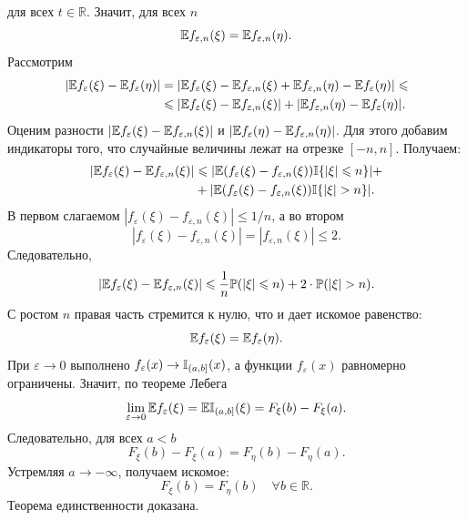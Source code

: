 \begin{proofbox}
    для всех $t \in \mathbb{R}$. Значит, для всех $n$
    \begin{equation*}
        \mathbb{E} f_{\varepsilon,n}(\xi) = \mathbb{E} f_{\varepsilon,n}(\eta).
    \end{equation*}
    Рассмотрим
    \begin{align*}
        |\mathbb{E} f_{\varepsilon}(\xi) - \mathbb{E} f_{\varepsilon}(\eta)| &= |\mathbb{E} f_{\varepsilon}(\xi) - \mathbb{E} f_{\varepsilon,n}(\xi) + \mathbb{E} f_{\varepsilon,n}(\eta) - \mathbb{E} f_{\varepsilon}(\eta)| \leqslant \\
        &\leqslant |\mathbb{E} f_{\varepsilon}(\xi) - \mathbb{E} f_{\varepsilon,n}(\xi)| + |\mathbb{E} f_{\varepsilon,n}(\eta) - \mathbb{E} f_{\varepsilon}(\eta)|.
    \end{align*}
    Оценим разности $|\mathbb{E} f_{\varepsilon}(\xi) - \mathbb{E} f_{\varepsilon,n}(\xi)|$ и $|\mathbb{E} f_{\varepsilon}(\eta) - \mathbb{E} f_{\varepsilon,n}(\eta)|$. Для этого добавим индикаторы того, что случайные величины лежат на отрезке $[-n, n]$. Получаем:
    \begin{align*}
        |\mathbb{E} f_{\varepsilon}(\xi) - \mathbb{E} f_{\varepsilon,n}(\xi)| &\leqslant |\mathbb{E}(f_{\varepsilon}(\xi) - f_{\varepsilon,n}(\xi))\mathbb{I}\{|\xi| \leqslant n\}| + \\
        &+ |\mathbb{E}(f_{\varepsilon}(\xi) - f_{\varepsilon,n}(\xi))\mathbb{I}\{|\xi| > n\}|.
    \end{align*}
    В первом слагаемом $|f_{\varepsilon}(\xi) - f_{\varepsilon,n}(\xi)| \leqslant 1/n$, а во втором
    \begin{equation*}
        |f_{\varepsilon}(\xi) - f_{\varepsilon,n}(\xi)| = |f_{\varepsilon,n}(\xi)| \leqslant 2.
    \end{equation*}
    Следовательно,
    \begin{equation*}
        |\mathbb{E} f_{\varepsilon}(\xi) - \mathbb{E} f_{\varepsilon,n}(\xi)| \leqslant \frac{1}{n}\mathbb{P}(|\xi| \leqslant n) + 2 \cdot \mathbb{P}(|\xi| > n).
    \end{equation*}
    С ростом $n$ правая часть стремится к нулю, что и дает искомое равенство:
    \begin{equation*}
        \mathbb{E} f_{\varepsilon}(\xi) = \mathbb{E} f_{\varepsilon}(\eta).
    \end{equation*}
    При $\varepsilon \to 0$ выполнено $f_{\varepsilon}(x) \to \mathbb{I}_{(a,b]}(x)$, а функции $f_{\varepsilon}(x)$ равномерно ограничены. Значит, по теореме Лебега
    \begin{equation*}
        \lim_{\varepsilon \to 0} \mathbb{E} f_{\varepsilon}(\xi) = \mathbb{E} \mathbb{I}_{(a,b]}(\xi) = F_{\xi}(b) - F_{\xi}(a).
    \end{equation*}
    Следовательно, для всех $a < b$
    \begin{equation*}
        F_{\xi}(b) - F_{\xi}(a) = F_{\eta}(b) - F_{\eta}(a).
    \end{equation*}
    Устремляя $a \to -\infty$, получаем искомое:
    \begin{equation*}
        F_{\xi}(b) = F_{\eta}(b) \quad \forall b \in \mathbb{R}.
    \end{equation*}
    Теорема единственности доказана.
\end{proofbox}

